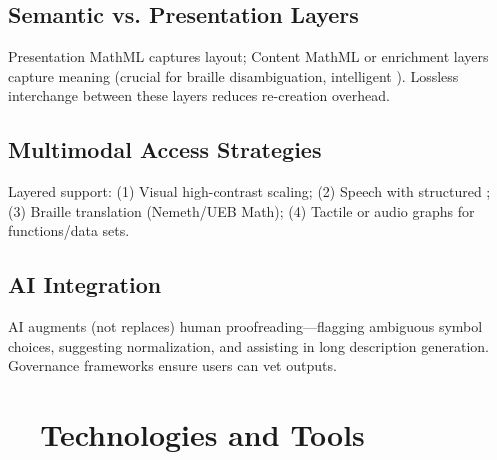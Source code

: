 \subsection{Semantic vs. Presentation Layers}
Presentation MathML captures layout; Content MathML or enrichment layers capture meaning (crucial for braille disambiguation, intelligent ). Lossless interchange between these layers reduces re-creation overhead.

\subsection{Multimodal Access Strategies}
Layered support: (1) Visual high-contrast scaling; (2) Speech with structured ; (3) Braille translation (Nemeth/UEB Math); (4) Tactile or audio graphs for functions/data sets.\supercite{ViewPlusAGC, OrionTI84}

\subsection{AI Integration}
AI augments (not replaces) human proofreading—flagging ambiguous symbol choices, suggesting normalization, and assisting in long description generation.\supercite{AI_Ethics_Bias, AIBrailleTranslation} Governance frameworks ensure users can vet outputs.

\section{~~Technologies and Tools}\label{ch11:sec:technologies-tools}

